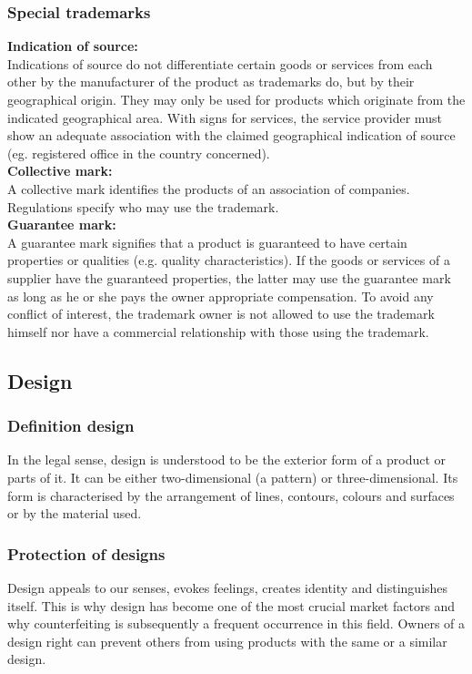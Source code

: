 \subsubsection{Special trademarks}
\textbf{Indication of source:}\\
Indications of source do not differentiate certain goods or services from each other by the manufacturer of the product as trademarks do, but by their geographical origin. They may only be used for products which originate from the indicated geographical area. With signs for services, the service provider must show an adequate association with the claimed geographical indication of source (eg. registered office in the country concerned).\\
\textbf{Collective mark:}\\
A collective mark identifies the products of an association of companies. Regulations specify who may use the trademark.\\
\textbf{Guarantee mark:} \\
A guarantee mark signifies that a product is guaranteed to have certain properties or qualities (e.g. quality characteristics). If the goods or services of a supplier have the guaranteed properties, the latter may use the guarantee mark as long as he or she pays the owner appropriate compensation. To avoid any conflict of interest, the trademark owner is not allowed to use the trademark himself nor have a commercial relationship with those using the trademark.

\subsection{Design}
\subsubsection{Definition design} 
In the legal sense, design is understood to be the exterior form of a product or parts of it. It can be either two-dimensional (a pattern) or three-dimensional. Its form is characterised by the arrangement of lines, contours, colours and surfaces or by the material used.

\subsubsection{Protection of designs}
Design appeals to our senses, evokes feelings, creates identity and distinguishes itself. This is why design has become one of the most crucial market factors and why counterfeiting is subsequently a frequent occurrence in this field. Owners of a design right can prevent others from using products with the same or a similar design.

